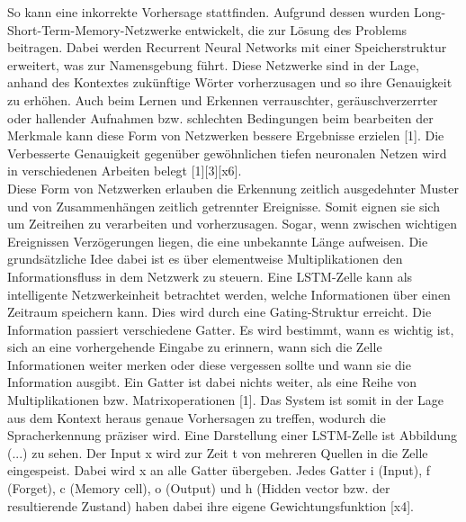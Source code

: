 So kann eine inkorrekte Vorhersage stattfinden. Aufgrund dessen wurden Long-Short-Term-Memory-Netzwerke entwickelt, die zur Lösung des Problems beitragen. Dabei werden Recurrent Neural Networks mit einer Speicherstruktur erweitert, was zur Namensgebung führt. Diese Netzwerke sind in der Lage, anhand des Kontextes zukünftige Wörter vorherzusagen und so ihre Genauigkeit zu erhöhen. Auch beim Lernen und Erkennen verrauschter, geräuschverzerrter oder hallender Aufnahmen bzw. schlechten Bedingungen beim bearbeiten der Merkmale kann diese Form von Netzwerken bessere Ergebnisse erzielen [1]. Die Verbesserte Genauigkeit gegenüber gewöhnlichen tiefen neuronalen Netzen wird in verschiedenen Arbeiten belegt [1][3][x6]. 
\\
Diese Form von Netzwerken erlauben die Erkennung zeitlich ausgedehnter Muster und von Zusammenhängen zeitlich getrennter Ereignisse. Somit eignen sie sich um Zeitreihen zu verarbeiten und vorherzusagen. Sogar, wenn zwischen wichtigen Ereignissen Verzögerungen liegen, die eine unbekannte Länge aufweisen. 
Die grundsätzliche Idee dabei ist es über elementweise Multiplikationen den Informationsfluss in dem Netzwerk zu steuern. Eine LSTM-Zelle kann als intelligente Netzwerkeinheit betrachtet werden, welche Informationen über einen Zeitraum speichern kann. Dies wird durch eine Gating-Struktur erreicht. Die Information passiert verschiedene Gatter. Es wird bestimmt, wann es wichtig ist, sich an eine vorhergehende Eingabe zu erinnern, wann sich die Zelle Informationen weiter merken oder diese vergessen sollte und wann sie die Information ausgibt. Ein Gatter ist dabei nichts weiter, als eine Reihe von Multiplikationen bzw. Matrixoperationen [1]. 
Das System ist somit in der Lage aus dem Kontext heraus genaue Vorhersagen zu treffen, wodurch die Spracherkennung präziser wird. Eine Darstellung einer LSTM-Zelle ist Abbildung (...) zu sehen. Der Input x wird zur Zeit t von mehreren Quellen in die Zelle eingespeist. Dabei wird x an alle Gatter übergeben. Jedes Gatter i (Input), f (Forget), c (Memory cell), o (Output) und h (Hidden vector bzw. der resultierende Zustand) haben dabei ihre eigene Gewichtungsfunktion [x4].   

